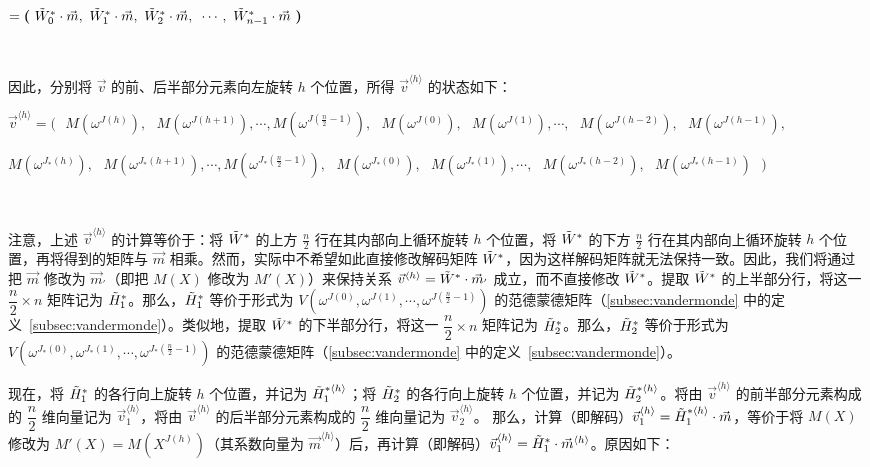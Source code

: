 \text{ } \text{ } $= \bm{(} \text{ } \tilde{W}^*_0\cdot \vec{m}, \text{ } \tilde{W}^*_1\cdot \vec{m}, \text{ } \tilde{W}^*_2\cdot \vec{m}, \text{ } \cdots, \text{ } \tilde{W}^*_{n - 1}\cdot \vec{m} \text{ } \bm{)} $ 

$ $

因此，分别将 $\vec{v}$ 的前、后半部分元素向左旋转 $h$ 个位置，所得 $\vec{v}^{\langle h \rangle}$ 的状态如下：

$\vec{v}^{\langle h \rangle} = \bm{(} \text{ } M(\omega^{J(h)}), \text{ } M(\omega^{J(h+1)}), \cdots, M(\omega^{J(\frac{n}{2}-1)}), \text{ } M(\omega^{J(0)}), \text{ }M(\omega^{J(1)}), \cdots, \text{ } M(\omega^{J(h-2)}), \text{ } M(\omega^{J(h-1)}),$

\text{ }\text{ }\text{ } $ M(\omega^{J_*(h)}), \text{ } M(\omega^{J_*(h+1)}), \cdots, M(\omega^{J_*(\frac{n}{2}-1)}), \text{ } M(\omega^{J_*(0)}), \text{ }M(\omega^{J_*(1)}), \cdots, \text{ } M(\omega^{J_*(h-2)}), \text{ } M(\omega^{J_*(h-1)}) \text{ } \bm{)}$

$ $

注意，上述 $\vec{v}^{\langle h \rangle}$ 的计算等价于：将 $\tilde{W}^*$ 的上方 $\frac{n}{2}$ 行在其内部向上循环旋转 $h$ 个位置，将 $\tilde{W}^{*}$ 的下方 $\frac{n}{2}$ 行在其内部向上循环旋转 $h$ 个位置，再将得到的矩阵与 $\vec{m}$ 相乘。然而，实际中不希望如此直接修改解码矩阵 $\tilde{W}^*$，因为这样解码矩阵就无法保持一致。因此，我们将通过把 $\vec{m}$ 修改为 $\vec{m}_{'}$（即把 $M(X)$ 修改为 $M'(X)$）来保持关系 $\vec{v}^{\langle h \rangle} = \tilde{W}^* \cdot \vec{m}_{'}$ 成立，而不直接修改 $\tilde{W}^*$。提取 $\tilde{W}^*$ 的上半部分行，将这一 $\dfrac{n}{2} \times n$ 矩阵记为 $\tilde{H}_1^*$。那么，$\tilde{H}_1^*$ 等价于形式为 $V(\omega^{J(0)}, \omega^{J(1)}, \cdots, \omega^{J(\frac{n}{2}-1)})$ 的范德蒙德矩阵（\autoref{subsec:vandermonde} 中的定义~\ref*{subsec:vandermonde}）。类似地，提取 $\tilde{W}^*$ 的下半部分行，将这一 $\dfrac{n}{2} \times n$ 矩阵记为 $\tilde{H}_2^*$。那么，$\tilde{H}_2^*$ 等价于形式为 $V(\omega^{J_*(0)}, \omega^{J_*(1)}, \cdots, \omega^{J_*(\frac{n}{2}-1)})$ 的范德蒙德矩阵（\autoref{subsec:vandermonde} 中的定义~\ref*{subsec:vandermonde}）。

现在，将 $\tilde{H}_1^*$ 的各行向上旋转 $h$ 个位置，并记为 $\tilde{H}_1^{*\langle h \rangle}$；将 $\tilde{H}_2^*$ 的各行向上旋转 $h$ 个位置，并记为 $\tilde{H}_2^{*\langle h \rangle}$。将由 $\vec{v}^{\langle h \rangle}$ 的前半部分元素构成的 $\dfrac{n}{2}$ 维向量记为 $\vec{v}_1^{\langle h \rangle}$，将由 $\vec{v}^{\langle h \rangle}$ 的后半部分元素构成的 $\dfrac{n}{2}$ 维向量记为 $\vec{v}_2^{\langle h \rangle}$。
那么，计算（即解码）$\vec{v}_1^{\langle h \rangle} = \tilde{H}_1^{*\langle h \rangle}\cdot \vec{m}$，等价于将 $M(X)$ 修改为 $M'(X) = M(X^{J(h)})$（其系数向量为 $\vec{m}^{\langle h \rangle}$）后，再计算（即解码）$\vec{v}_1^{\langle h \rangle} = \tilde{H}_1^{*}\cdot \vec{m}^{\langle h \rangle}$。原因如下：

